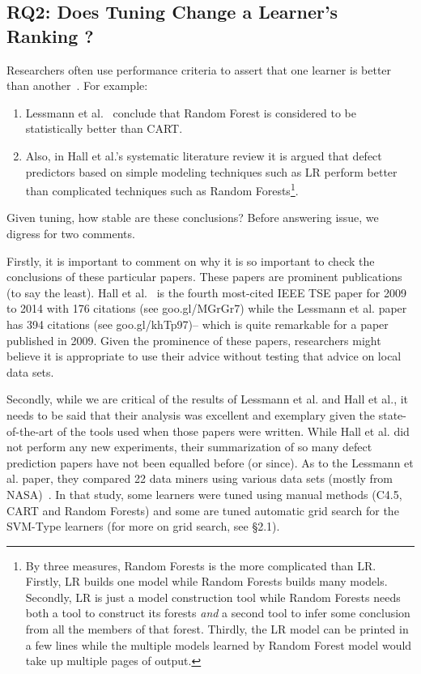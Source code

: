 \documentclass{sig-alternative}
\newcommand{\be}{\begin{enumerate}}
\newcommand{\ee}{\end{enumerate}}
\begin{document}
\subsection{RQ2:  Does Tuning Change a Learner's Ranking ?}\label{sect:rank}
Researchers often use performance criteria to assert that one learner is better than 
another~\cite{lessmann2008benchmarking,me07b,hall11}. For example:
\be
\item
Lessmann et al.~\cite{lessmann2008benchmarking} conclude that
Random Forest is considered to be statistically 
better than CART. 
\item
Also, in Hall et al.'s   systematic literature review\cite{hall11} it is argued 
that defect predictors based on simple 
modeling techniques such as LR perform better than complicated techniques such as Random Forests\footnote{By three measures,
Random Forests
is the more complicated than LR. Firstly, LR builds one model
while Random Forests builds many models. Secondly, LR is just
a model construction tool while Random Forests needs both
a tool to construct its forests {\em and} a second tool
to  infer some conclusion from all the members of that forest.
Thirdly, the LR model can be printed in a few lines while the multiple
models learned by Random
Forest model would take up multiple pages of output.}.
\ee
Given tuning, how stable are these  conclusions?
Before answering issue, we digress for two comments.



Firstly, it is important to comment on why it is  so important to check the conclusions
of these particular papers. 
These  papers are prominent publications (to say the least).
Hall et al.~\cite{hall11} is the fourth most-cited IEEE TSE
paper for 2009 to 2014 with 176 citations (see goo.gl/MGrGr7)
while the Lessmann et al. paper~\cite{lessmann2008benchmarking} has 394 citations (see
goo.gl/khTp97)-- which is quite remarkable for a paper published in 2009.
Given the prominence
of these papers, researchers might believe it is
appropriate to
  use  their advice without testing that advice on local data sets.

Secondly, while we are critical of the results of
Lessmann et al. and Hall et al., it needs to be said that  their analysis  was 
excellent and exemplary given the state-of-the-art of the tools used when those papers were written.  
While Hall et al. did not perform any new experiments, 
their
summarization of so many defect prediction papers have not been equalled
before (or since).
As to the Lessmann et al. paper, they  compared
22 data miners using various   data sets (mostly from NASA)~\cite{lessmann2008benchmarking}.
In that study, some learners were tuned using manual methods 
(C4.5, CART and Random Forests)
and some are tuned automatic  grid search for the SVM-Type learners (for more on grid search, see   {\S}2.1).
\end{document}
